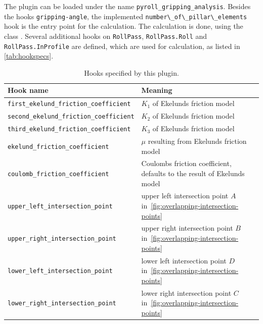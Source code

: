 \documentclass[11pt]{PyRollDocs}
\begin{document}
    The plugin can be loaded under the name \texttt{pyroll\_gripping\_analysis}.
    Besides the hooks \lstinline{gripping-angle}, the implemented \lstinline{number\_of\_pillar\_elements} hook is the entry point for the calculation.
    The calculation is done, using the class .
    Several additional hooks on \lstinline{RollPass}, \lstinline{RollPass.Roll} and \lstinline{RollPass.InProfile} are defined, which are used for calculation, as listed in \autoref{tab:hookspecs}.

    \begin{table}
        \centering
        \caption{Hooks specified by this plugin.}
        \label{tab:hookspecs}
        \begin{tabular}{ll}
            \toprule
            Hook name                                       & Meaning                                                                         \\
            \midrule
            \texttt{first\_ekelund\_friction\_coefficient}  & $K_1$ of Ekelunds friction model                                                \\
            \texttt{second\_ekelund\_friction\_coefficient} & $K_2$ of Ekelunds friction model                                                \\
            \texttt{third\_ekelund\_friction\_coefficient}  & $K_3$ of Ekelunds friction model                                                \\
            \texttt{ekelund\_friction\_coefficient}         & $\mu$ resulting from Ekelunds friction model                                    \\
            \texttt{coulomb\_friction\_coefficient}         & Coulombs friction coefficient, defaults to the result of Ekelunds model         \\
            \texttt{upper\_left\_intersection\_point}       & upper left intersection point $A$ in~\ref{fig:overlapping-intersection-points}  \\
            \texttt{upper\_right\_intersection\_point}      & upper right intersection point $B$ in~\ref{fig:overlapping-intersection-points} \\
            \texttt{lower\_left\_intersection\_point}       & lower left intersection point $D$ in~\ref{fig:overlapping-intersection-points}  \\
            \texttt{lower\_right\_intersection\_point}      & lower right intersection point $C$ in~\ref{fig:overlapping-intersection-points} \\

\end{tabular}
\end{table}
\end{document}
